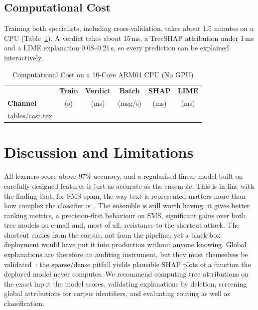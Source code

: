 \documentclass[conference]{IEEEtran}
\makeatletter
\newcommand{\inputtable}[1]{\@@input #1 }
\newcommand{\tok}[1]{\texttt{\detokenize{#1}}}
\makeatother
\begin{document}
\subsection{Computational Cost}

Training both specialists, including cross-validation, takes about 1.5 minutes
on a CPU (Table~\ref{tab:cost}). A verdict takes about 15\,ms, a TreeSHAP
attribution under 1\,ms and a LIME explanation 0.08--0.21\,s, so every
prediction can be explained interactively.

\begin{table}[!t]
\caption{Computational Cost on a 10-Core ARM64 CPU (No GPU)}
\label{tab:cost}
\centering
\footnotesize
\setlength{\tabcolsep}{3.0pt}
\begin{tabular}{@{}lccccc@{}}
\toprule
 & \textbf{Train} & \textbf{Verdict} & \textbf{Batch} & \textbf{SHAP} & \textbf{LIME} \\
\textbf{Channel} & (s) & (ms) & (msg/s) & (ms) & (ms) \\
\midrule
\inputtable{tables/cost.tex}
\bottomrule
\end{tabular}
\end{table}

\section{Discussion and Limitations}\label{sec:discussion}

All learners score above 97\% accuracy, and a regularised linear model built
on carefully designed features is just as accurate as the ensemble. This is in
line with the finding that, for SMS spam, the way text is represented matters
more than how complex the classifier is~\cite{sahin2026revisiting}. The
ensemble is still worth having: it gives better ranking metrics, a
precision-first behaviour on SMS, significant gains over both tree models on
e-mail and, most of all, resistance to the shortcut attack. The \tok{enron}
shortcut comes from the corpus, not from the pipeline, yet a black-box
deployment would have put it into production without anyone knowing. Global
explanations are
therefore an auditing instrument, but they must themselves be
validated~\cite{lyu2024faithful}: the sparse/dense pitfall yields plausible
SHAP plots of a function the deployed model never computes. We recommend
computing tree attributions on the exact input the model scores, validating
explanations by deletion, screening global attributions for corpus
identifiers, and evaluating routing as well as classification.
\end{document}
